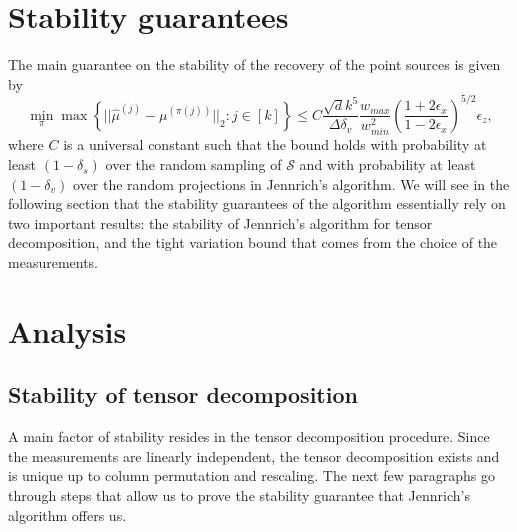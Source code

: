 \section{Stability guarantees}
The main guarantee on the stability of the recovery of the point sources is given by $$\min_\pi\max\left\{||\widehat{\mu}^{(j)}-\mu^{(\pi(j))}||_2:j\in[k]\right\}\leq C\frac{\sqrt{d}k^5}{\Delta\delta_v}\frac{w_{max}}{w_{min}^2}\left(\frac{1+2\epsilon_x}{1-2\epsilon_x}\right)^{5/2}\epsilon_z,$$ where $C$ is a universal constant such that the bound holds with probability at least $(1-\delta_s)$ over the random sampling of $\mathcal{S}$ and with probability at least $(1-\delta_v)$ over the random projections in Jennrich's algorithm. We will see in the following section that the stability guarantees of the algorithm essentially rely on two important results: the stability of Jennrich's algorithm for tensor decomposition, and the tight variation bound that comes from the choice of the measurements.
\section{Analysis}
\subsection{Stability of tensor decomposition}
A main factor of stability resides in the tensor decomposition procedure. Since the measurements are linearly independent, the tensor decomposition exists and is unique up to column permutation and rescaling. The next few paragraphs go through steps that allow us to prove the stability guarantee that Jennrich's algorithm offers us.
